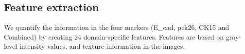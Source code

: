 \subsection{Feature extraction}

We quantify the information in the four markers (E\_cad, pck26, CK15 and Combined) by creating 24 domain-specific features. Features are based on gray-level intensity values, and texture information \cite{haralick1979statistical, haralick1973textural} in the images. 


